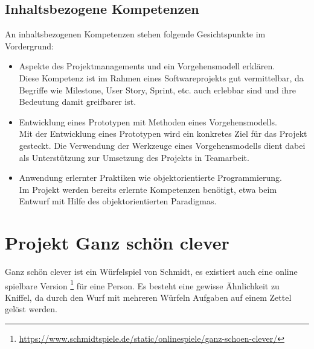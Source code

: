 \documentclass[a4paper,12pt]{article}
\begin{document}
\subsection{Inhaltsbezogene Kompetenzen}
    An inhaltsbezogenen Kompetenzen stehen folgende Gesichtspunkte im Vordergrund:
    \begin{itemize}
        \item Aspekte des Projektmanagements und ein Vorgehensmodell erklären.\\
            Diese Kompetenz ist im Rahmen eines Softwareprojekts gut vermittelbar,
            da Begriffe wie Milestone, User Story, Sprint, etc. auch erlebbar sind 
            und ihre Bedeutung damit greifbarer ist.
            
        \item Entwicklung eines Prototypen mit Methoden eines Vorgehensmodells.\\
            Mit der Entwicklung eines Prototypen wird ein konkretes Ziel für das Projekt gesteckt.
            Die Verwendung der Werkzeuge eines Vorgehensmodells dient dabei als Unterstützung
            zur Umsetzung des Projekts in Teamarbeit.
        \item Anwendung erlernter Praktiken wie objektorientierte Programmierung.\\
            Im Projekt werden bereits erlernte Kompetenzen benötigt, 
            etwa beim Entwurf mit Hilfe des objektorientierten Paradigmas.
    \end{itemize}



\section{Projekt \glqq Ganz schön clever\grqq}
    Ganz schön clever ist ein Würfelspiel von Schmidt,
    es existiert auch eine online spielbare Version 
    \footnote{\url{https://www.schmidtspiele.de/static/onlinespiele/ganz-schoen-clever/}} 
    für eine Person.
    Es besteht eine gewisse Ähnlichkeit zu Kniffel, 
    da durch den Wurf mit mehreren Würfeln Aufgaben auf einem Zettel gelöst werden.
\end{document}
